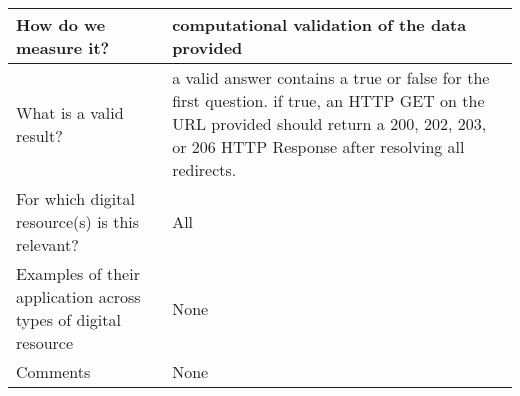\documentclass[english]{article}
\begin{document}
\begin{longtable}{|p{5cm}|p{9cm}|}
\\



\hline
How do we measure it? &  


computational validation of the data provided




\\



\hline
What is a valid result? &  



a valid answer contains a true or false for the first question. if true, an HTTP GET on the URL provided should return a 200, 202, 203, or 206 HTTP Response after resolving all redirects.


\\



\hline
For which digital resource(s) is this relevant? &  All\\



\hline
Examples of their application across types of digital resource &  None

\\



\hline

Comments & None 

\\
\hline

\end{longtable}




\newpage
\end{document}
